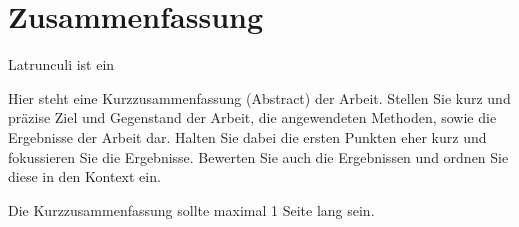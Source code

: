 \chapter*{Zusammenfassung}
Latrunculi ist ein


Hier steht eine Kurzzusammenfassung (Abstract) der Arbeit. Stellen Sie kurz und präzise Ziel und Gegenstand der Arbeit, die angewendeten Methoden, sowie die Ergebnisse der Arbeit dar. Halten Sie dabei die ersten Punkten eher kurz und fokussieren Sie die Ergebnisse. Bewerten Sie auch die Ergebnissen und ordnen Sie diese in den Kontext ein.

Die Kurzzusammenfassung sollte maximal 1 Seite lang sein.
